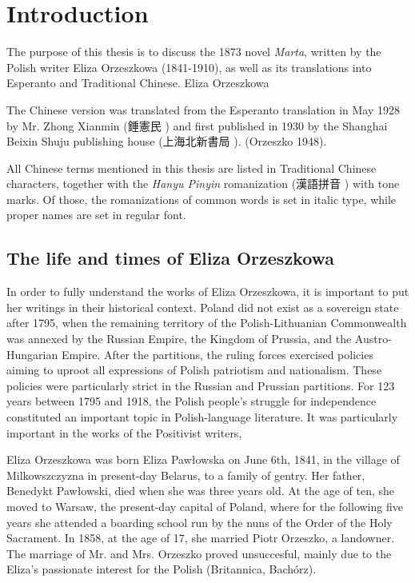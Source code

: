 \chapter{Introduction}

The purpose of this thesis is to discuss the 1873 novel \textit{Marta}, written by the Polish writer Eliza Orzeszkowa (1841-1910), as well as its translations into Esperanto and Traditional Chinese.
Eliza Orzeszkowa 

The Chinese version was translated from the Esperanto translation in May 1928 by Mr. Zhong Xianmin (錘憲民 ) and first published in 1930 by the Shanghai Beixin Shuju publishing house (上海北新書局 ).
(Orzeszko 1948).

All Chinese terms mentioned in this thesis are listed in Traditional Chinese characters, together with the \textit{Hanyu Pinyin} romanization (漢語拼音 ) with tone marks. Of those, the romanizations of common words is set in italic type, while proper names are set in regular font.

\section{The life and times of Eliza Orzeszkowa}

In order to fully understand the works of Eliza Orzeszkowa, it is important to put her writings in their historical context.
Poland did not exist as a sovereign state after 1795, when the remaining territory of the Polish-Lithuanian Commonwealth was annexed by the Russian Empire, the  Kingdom of Prussia, and the Austro-Hungarian Empire.
After the partitions, the ruling forces exercised policies aiming to uproot all expressions of Polish patriotism and nationalism. These policies were particularly strict in the Russian and Prussian partitions.
For 123 years between 1795 and 1918, the Polish people's struggle for independence constituted an important topic in Polish-language literature.
It was particularly important in the works of the Positivist writers, 

Eliza Orzeszkowa was born Eliza Pawłowska on June 6th, 1841, in the village of Milkowszczyzna in present-day Belarus, to a family of gentry. Her father, Benedykt Pawłowski, died when she was three years old. 
At the age of ten, she moved to Warsaw, the present-day capital of Poland, where for the following five years she attended a boarding school run by the nuns of the Order of the Holy Sacrament.
In 1858, at the age of 17, she married Piotr Orzeszko, a landowner.
The marriage of Mr. and Mrs. Orzeszko proved unsuccesful, mainly due to the Eliza's passionate interest for the Polish 
(Britannica, Bachórz).

